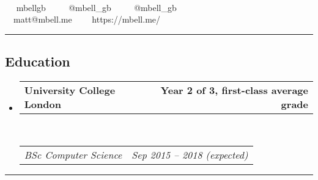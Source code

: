 \documentclass[11pt,a4paper]{article}
\makeatletter
\newcommand{\headerrow}[2]
{\begin{tabular*}{\linewidth}{l@{\extracolsep{\fill}}r}
	#1 &
	#2 \\
\end{tabular*}}
\makeatother
\begin{document}
\begin{center}
{\Huge {}}\\


\ \  mbellgb\ \ \textbullet
\ \  @mbell\_gb\ \ \textbullet
\ \  @mbell\_gb\ \ \textbullet
\\
\ \ matt@mbell.me\ \ \textbullet
\ \ https://mbell.me/
\end{center}


\hrule
\vspace{-1.2em}
\subsection*{Education}

\begin{itemize}
	\parskip=0.1em

	\item
	\headerrow
		{\textbf{University College London}}
		{\textbf{Year 2 of 3, first-class average grade}}\\
	\headerrow
		{\emph{BSc Computer Science}}
		{\emph{Sep 2015 -- 2018 (expected)}}


\end{itemize}


 \vspace{-0.4em}
 \hrule
 \vspace{-1.2em}
\end{document}
